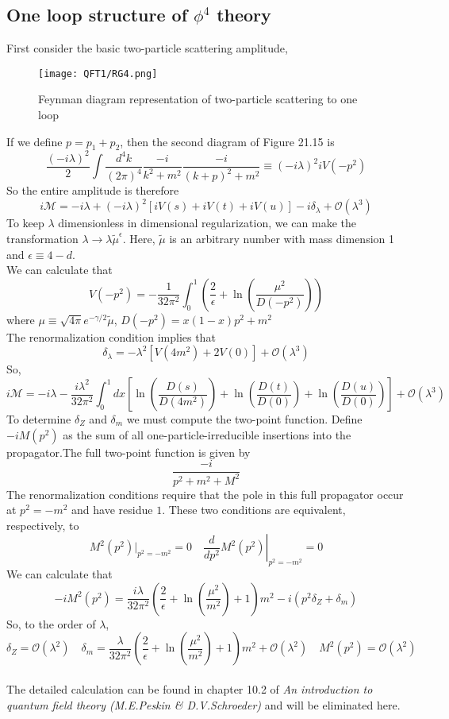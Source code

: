 \documentclass[cyan]{elegantnote}
\begin{document}
\subsection{One loop structure of $\phi^4$ theory}
First consider the basic two-particle scattering amplitude,
\begin{figure}[!h]
\centering
\texttt{[image: QFT1/RG4.png]}
\caption{Feynman diagram representation of two-particle scattering to one loop}
\end{figure}
If we define $p = p_1 + p_2$, then the second diagram of Figure 21.15 is
\[\frac{(-i\lambda)^2}{2} \int \frac{d^4k}{(2\pi)^4} \frac{-i}{k^2+m^2} \frac{-i}{(k+p)^2+m^2} \equiv (-i\lambda)^2 iV(-p^2)\]
So the entire amplitude is therefore
\[i\mathcal{M} = -i\lambda + (-i\lambda)^2 [iV(s) + iV(t) + iV(u)] -i\delta_{\lambda} + \mathcal{O}(\lambda^3)\] 
To keep $\lambda$ dimensionless in dimensional regularization, we can make the transformation $\lambda \to \lambda \tilde{\mu}^{\epsilon}$. Here, $\tilde{\mu}$ is an arbitrary number with mass dimension 1 and $\epsilon \equiv 4-d$. 
\\
We can calculate that
\[V(-p^2) = -\frac{1}{32\pi^2} \int_0^1 (\frac{2}{\epsilon} + \ln(\frac{\mu^2}{D(-p^2)}))\]
where $\mu \equiv  \sqrt{4\pi} e^{-\gamma/2} \tilde{\mu}$, $D(-p^2) = x(1-x)p^2+m^2$
\\
The renormalization condition implies that
\[\delta_{\lambda} = -\lambda^2[V(4m^2)+2V(0)] + \mathcal{O}(\lambda^3)\]
So,
\[i\mathcal{M} = -i\lambda -\frac{i\lambda^2}{32\pi^2} \int_0^1 dx \left[\ln(\frac{D(s)}{D(4m^2)}) +\ln(\frac{D(t)}{D(0)})+\ln(\frac{D(u)}{D(0)})\right] + \mathcal{O}(\lambda^3)\]
To determine $\delta_Z$ and $\delta_m$ we must compute the two-point function. Define $-iM(p^2)$ as the sum of all one-particle-irreducible insertions into the propagator.The full two-point function is given by
\[\frac{-i}{p^2 + m^2 + M^2}\]
The renormalization conditions require that the pole in this full propagator occur at $p^2=-m^2$ and have residue $1$. These two conditions are equivalent, respectively, to
\[M^2(p^2)|_{p^2=-m^2} = 0 \quad \left. \frac{d}{dp^2} M^2(p^2)\right|_{p^2=-m^2} =0\]
We can calculate that
\[-iM^2(p^2) = \frac{i\lambda}{32\pi^2}(\frac{2}{\epsilon} + \ln(\frac{\mu^2}{m^2})+1)m^2 -i(p^2\delta_Z + \delta_m)\]
So, to the order of $\lambda$, 
\[\delta_Z=\mathcal{O}(\lambda^2) \quad \delta_m = \frac{\lambda}{32\pi^2}(\frac{2}{\epsilon} + \ln(\frac{\mu^2}{m^2})+1)m^2 + \mathcal{O}(\lambda^2) \quad M^2(p^2) =\mathcal{O}(\lambda^2)\]
\\
The detailed calculation can be found in chapter 10.2 of \emph{An introduction to quantum field theory (M.E.Peskin \& D.V.Schroeder)} and will be eliminated here.
\end{document}
